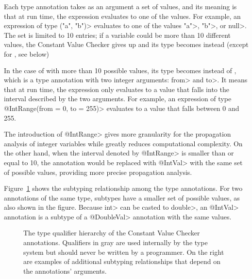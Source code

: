 Each type annotation takes as an argument a set of values, and its meaning
is that at run time, the expression evaluates to one of the values.  For
example, an expression of type
\<("a", "b")> evaluates to
one of the values \<"a">, \<"b">, or \<null>.
The set is limited to 10 entries; if a variable
could be more than 10 different values, the Constant Value
Checker gives up and its type becomes
 instead (except for
, see below)


In the case of
with more than 10 possible values, its type becomes
 instead of
,
which is a type annotation with two integer arguments: \<from> and \<to>.
It means that at run time, the expression only evaluates to a value that
falls into the interval described by the two arguments. For example, an
expression of type \<@IntRange(from = 0, to = 255)> evaluates to a value
that falls between 0 and 255.

The introduction of \<@IntRange> gives more granularity for the propagation
analysis of integer variables while greatly reduces computational
complexity. On the other hand, when the interval denoted by \<@IntRange>
is smaller than or equal to 10, the annotation would be replaced with
\<@IntVal> with the same set of possible values, providing more precise
propagation analysis.

Figure~\ref{fig-value-hierarchy} shows the
subtyping relationship among the type annotations.
For two annotations of the same type, subtypes have a smaller set of
possible values, as also shown in the figure.
Because \<int> can be casted to \<double>, an \<@IntVal> annotation is a
subtype of a \<@DoubleVal> annotation with the same values.

\begin{figure}
\caption{The type qualifier hierarchy of the Constant Value Checker
annotations. Qualifiers in gray are used
internally by the type system but should never be written by a
programmer.  On the right are examples of additional subtyping
relationships that depend on the annotations' arguments.}
\label{fig-value-hierarchy}
\end{figure}


